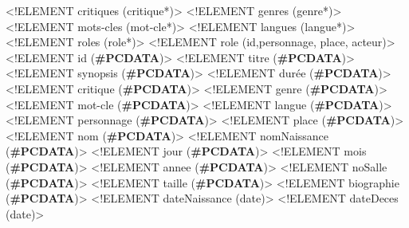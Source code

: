 \documentclass[]{article}
\newenvironment{Shaded}{}{}
\newcommand{\KeywordTok}[1]{\textcolor[rgb]{0.00,0.44,0.13}{\textbf{{#1}}}}
\newcommand{\DataTypeTok}[1]{\textcolor[rgb]{0.56,0.13,0.00}{{#1}}}
\newcommand{\DecValTok}[1]{\textcolor[rgb]{0.25,0.63,0.44}{{#1}}}
\newcommand{\FloatTok}[1]{\textcolor[rgb]{0.25,0.63,0.44}{{#1}}}
\newcommand{\FunctionTok}[1]{\textcolor[rgb]{0.02,0.16,0.49}{{#1}}}
\newcommand{\NormalTok}[1]{{#1}}
\begin{document}
\begin{Shaded}
\begin{Highlighting}[]
\DataTypeTok{<!ELEMENT} \FunctionTok{critiques} \DecValTok{(}\FunctionTok{critique}\FloatTok{*}\DecValTok{)}\DataTypeTok{>}
\DataTypeTok{<!ELEMENT} \FunctionTok{genres} \DecValTok{(}\FunctionTok{genre}\FloatTok{*}\DecValTok{)}\DataTypeTok{>}
\DataTypeTok{<!ELEMENT} \FunctionTok{mots-cles} \DecValTok{(}\FunctionTok{mot-cle}\FloatTok{*}\DecValTok{)}\DataTypeTok{>}
\DataTypeTok{<!ELEMENT} \FunctionTok{langues} \DecValTok{(}\FunctionTok{langue}\FloatTok{*}\DecValTok{)}\DataTypeTok{>}
\DataTypeTok{<!ELEMENT} \FunctionTok{roles} \DecValTok{(}\FunctionTok{role}\FloatTok{*}\DecValTok{)}\DataTypeTok{>}
\DataTypeTok{<!ELEMENT} \FunctionTok{role} \DecValTok{(}\FunctionTok{id}\DecValTok{,}\FunctionTok{personnage}\DecValTok{,} \FunctionTok{place}\DecValTok{,} \FunctionTok{acteur}\DecValTok{)}\DataTypeTok{>}
\DataTypeTok{<!ELEMENT} \FunctionTok{id} \DecValTok{(}\KeywordTok{#PCDATA}\DecValTok{)}\DataTypeTok{>}
\DataTypeTok{<!ELEMENT} \FunctionTok{titre} \DecValTok{(}\KeywordTok{#PCDATA}\DecValTok{)}\DataTypeTok{>}
\DataTypeTok{<!ELEMENT} \FunctionTok{synopsis} \DecValTok{(}\KeywordTok{#PCDATA}\DecValTok{)}\DataTypeTok{>}
\DataTypeTok{<!ELEMENT} \FunctionTok{dur}\NormalTok{é}\FunctionTok{e} \DecValTok{(}\KeywordTok{#PCDATA}\DecValTok{)}\DataTypeTok{>}
\DataTypeTok{<!ELEMENT} \FunctionTok{critique} \DecValTok{(}\KeywordTok{#PCDATA}\DecValTok{)}\DataTypeTok{>}
\DataTypeTok{<!ELEMENT} \FunctionTok{genre} \DecValTok{(}\KeywordTok{#PCDATA}\DecValTok{)}\DataTypeTok{>}
\DataTypeTok{<!ELEMENT} \FunctionTok{mot-cle} \DecValTok{(}\KeywordTok{#PCDATA}\DecValTok{)}\DataTypeTok{>}
\DataTypeTok{<!ELEMENT} \FunctionTok{langue} \DecValTok{(}\KeywordTok{#PCDATA}\DecValTok{)}\DataTypeTok{>}
\DataTypeTok{<!ELEMENT} \FunctionTok{personnage} \DecValTok{(}\KeywordTok{#PCDATA}\DecValTok{)}\DataTypeTok{>}
\DataTypeTok{<!ELEMENT} \FunctionTok{place} \DecValTok{(}\KeywordTok{#PCDATA}\DecValTok{)}\DataTypeTok{>}
\DataTypeTok{<!ELEMENT} \FunctionTok{nom} \DecValTok{(}\KeywordTok{#PCDATA}\DecValTok{)}\DataTypeTok{>}
\DataTypeTok{<!ELEMENT} \FunctionTok{nomNaissance} \DecValTok{(}\KeywordTok{#PCDATA}\DecValTok{)}\DataTypeTok{>}
\DataTypeTok{<!ELEMENT} \FunctionTok{jour} \DecValTok{(}\KeywordTok{#PCDATA}\DecValTok{)}\DataTypeTok{>}
\DataTypeTok{<!ELEMENT} \FunctionTok{mois} \DecValTok{(}\KeywordTok{#PCDATA}\DecValTok{)}\DataTypeTok{>}
\DataTypeTok{<!ELEMENT} \FunctionTok{annee} \DecValTok{(}\KeywordTok{#PCDATA}\DecValTok{)}\DataTypeTok{>}
\DataTypeTok{<!ELEMENT} \FunctionTok{noSalle} \DecValTok{(}\KeywordTok{#PCDATA}\DecValTok{)}\DataTypeTok{>}
\DataTypeTok{<!ELEMENT} \FunctionTok{taille} \DecValTok{(}\KeywordTok{#PCDATA}\DecValTok{)}\DataTypeTok{>}
\DataTypeTok{<!ELEMENT} \FunctionTok{biographie} \DecValTok{(}\KeywordTok{#PCDATA}\DecValTok{)}\DataTypeTok{>}
\DataTypeTok{<!ELEMENT} \FunctionTok{dateNaissance} \DecValTok{(}\FunctionTok{date}\DecValTok{)}\DataTypeTok{>}
\DataTypeTok{<!ELEMENT} \FunctionTok{dateDeces} \DecValTok{(}\FunctionTok{date}\DecValTok{)}\DataTypeTok{>}


\end{Highlighting}
\end{Shaded}
\end{document}
